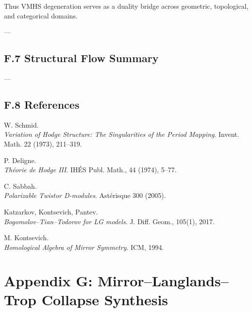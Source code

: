 \documentclass[11pt]{article}
\begin{document}
Thus VMHS degeneration serves as a duality bridge across geometric, topological, and categorical domains.

---

\subsection*{F.7 Structural Flow Summary}

\begin{center}
\end{center}

---

\subsection*{F.8 References}

\begin{thebibliography}{9}

W. Schmid.\\
\textit{Variation of Hodge Structure: The Singularities of the Period Mapping}.  
Invent. Math. 22 (1973), 211–319.

P. Deligne.\\
\textit{Théorie de Hodge III}.  
IHÉS Publ. Math., 44 (1974), 5–77.

C. Sabbah.\\
\textit{Polarizable Twistor D-modules}.  
Astérisque 300 (2005).

Katzarkov, Kontsevich, Pantev.\\
\textit{Bogomolov–Tian–Todorov for LG models}.  
J. Diff. Geom., 105(1), 2017.

M. Kontsevich.\\
\textit{Homological Algebra of Mirror Symmetry}.  
ICM, 1994.

\end{thebibliography}



\section*{Appendix G: Mirror–Langlands–Trop Collapse Synthesis}
\end{document}
